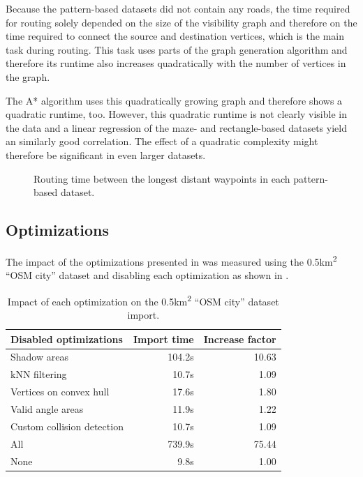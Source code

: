 			Because the pattern-based datasets did not contain any roads, the time required for routing solely depended on the size of the visibility graph and therefore on the time required to connect the source and destination vertices, which is the main task during routing.
			This task uses parts of the graph generation algorithm and therefore its runtime also increases quadratically with the number of vertices in the graph.
			
			The A* algorithm uses this quadratically growing graph and therefore shows a quadratic runtime, too.
			However, this quadratic runtime is not clearly visible in the data and a linear regression of the maze- and rectangle-based datasets yield an similarly good correlation.
			The effect of a quadratic complexity might therefore be significant in even larger datasets.
			
			\begin{figure}[h!]
				\hspace{-20pt}
				
				\caption{Routing time between the longest distant waypoints in each pattern-based dataset.}
				\label{fig:eval-pattern-routing-details}
			\end{figure}
		
	\subsection{Optimizations}
	
		The impact of the optimizations presented in  was measured using the 0.5km\textsuperscript{2} \enquote{OSM city} dataset and disabling each optimization as shown in .
		
		\begin{table}[h]
			\begin{figcenter}
				\begin{tabularx}{11cm}{p{4.5cm}RR}
\toprule
\textbf{Disabled optimizations}				& \textbf{Import time}	& \textbf{Increase factor}	\\
\midrule
Shadow areas								& 104.2s 				& 10.63						\\
kNN filtering								&  10.7s				&  1.09						\\
Vertices on convex hull						&  17.6s				&  1.80						\\
Valid angle areas							&  11.9s				&  1.22						\\
Custom collision detection					&  10.7s				&  1.09						\\
\midrule
All											& 739.9s 				& 75.44						\\
None										&   9.8s				&  1.00						\\
\bottomrule
				\end{tabularx}
			\end{figcenter}
			\caption{Impact of each optimization on the 0.5km\textsuperscript{2} \enquote{OSM city} dataset import.}
			\label{table:optimization-impact}
		\end{table}
		

